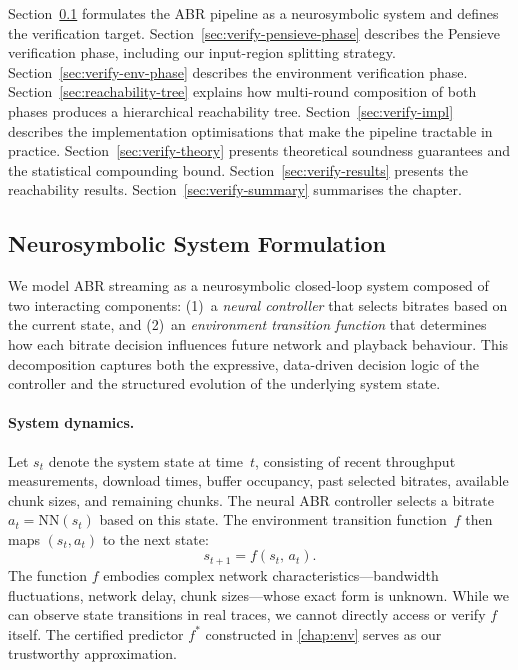\documentclass[thesis]{uofithesis} %
\begin{document}
    Section~\ref{sec:verify-formulation} formulates the ABR pipeline as a
    neurosymbolic system and defines the verification target.
    Section~\ref{sec:verify-pensieve-phase} describes the Pensieve
    verification phase, including our input-region splitting strategy.
    Section~\ref{sec:verify-env-phase} describes the environment
    verification phase.
    Section~\ref{sec:reachability-tree} explains how multi-round
    composition of both phases produces a hierarchical reachability tree.
    Section~\ref{sec:verify-impl} describes the implementation optimisations
    that make the pipeline tractable in practice.
    Section~\ref{sec:verify-theory} presents theoretical soundness
    guarantees and the statistical compounding bound.
    Section~\ref{sec:verify-results} presents the reachability results.
    Section~\ref{sec:verify-summary} summarises the chapter.


    \subsection{Neurosymbolic System Formulation}
    \label{sec:verify-formulation}

    We model ABR streaming as a neurosymbolic closed-loop system composed
    of two interacting components: (1)~a \emph{neural controller} that
    selects bitrates based on the current state, and (2)~an
    \emph{environment transition function} that determines how each bitrate
    decision influences future network and playback behaviour.  This
    decomposition captures both the expressive, data-driven decision logic
    of the controller and the structured evolution of the underlying system
    state.

    \paragraph{System dynamics.}
    Let $s_t$ denote the system state at time~$t$, consisting of recent
    throughput measurements, download times, buffer occupancy, past
    selected bitrates, available chunk sizes, and remaining chunks.  The neural
    ABR controller selects a bitrate $a_t = \mathrm{NN}(s_t)$ based on this
    state.  The environment transition function~$f$ then maps
    $(s_t, a_t)$ to the next state:
    \begin{equation}
        s_{t+1} = f(s_t,\, a_t).
        \label{eq:verify-transition}
    \end{equation}
    The function $f$ embodies complex network characteristics---bandwidth
    fluctuations, network delay, chunk sizes---whose exact form is unknown.
    While we can observe state transitions in real traces, we cannot
    directly access or verify $f$ itself.  The certified predictor
    $f^{\ast}$ constructed in \ref{chap:env} serves as our
    trustworthy approximation.
\end{document}
